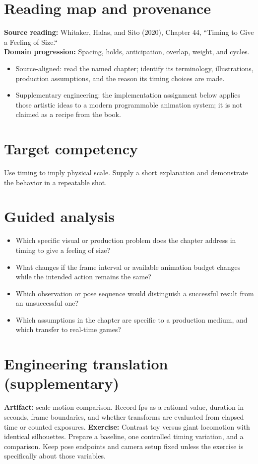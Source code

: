 \documentclass[10pt,letterpaper]{article}
\begin{document}
\makedoctitle
\makedocsummary

\section{Reading map and provenance}
\textbf{Source reading:} Whitaker, Halas, and Sito (2020), Chapter 44, ``Timing to Give a Feeling of Size.``\\
\textbf{Domain progression:} Spacing, holds, anticipation, overlap, weight, and cycles.
\begin{itemize}
\item Source-aligned: read the named chapter; identify its terminology, illustrations, production assumptions, and the reason its timing choices are made.
\item Supplementary engineering: the implementation assignment below applies those artistic ideas to a modern programmable animation system; it is not claimed as a recipe from the book.
\end{itemize}
\section{Target competency}
Use timing to imply physical scale. Supply a short explanation and demonstrate the behavior in a repeatable shot.
\section{Guided analysis}
\begin{itemize}
\item Which specific visual or production problem does the chapter address in timing to give a feeling of size?
\item What changes if the frame interval or available animation budget changes while the intended action remains the same?
\item Which observation or pose sequence would distinguish a successful result from an unsuccessful one?
\item Which assumptions in the chapter are specific to a production medium, and which transfer to real-time games?
\end{itemize}
\section{Engineering translation (supplementary)}
\textbf{Artifact:} scale-motion comparison. Record fps as a rational value, duration in seconds, frame boundaries, and whether transforms are evaluated from elapsed time or counted exposures.
\textbf{Exercise:} Contrast toy versus giant locomotion with identical silhouettes. Prepare a baseline, one controlled timing variation, and a comparison. Keep pose endpoints and camera setup fixed unless the exercise is specifically about those variables.
\end{document}
